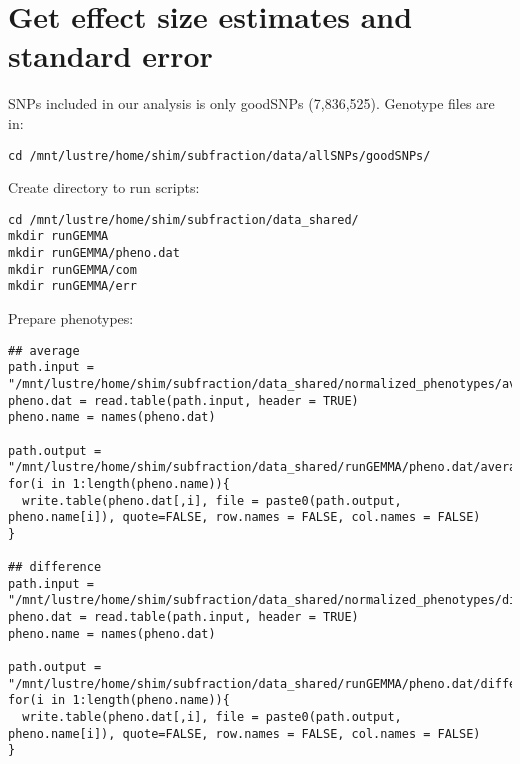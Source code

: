 \documentclass[11pt]{article}
\begin{document}
\section{Get effect size estimates and standard error}
\label{sec-4}
SNPs included in our analysis is only goodSNPs (7,836,525). Genotype files are in:
\begin{lstlisting}
cd /mnt/lustre/home/shim/subfraction/data/allSNPs/goodSNPs/
\end{lstlisting}

Create directory to run scripts:
\begin{lstlisting}
cd /mnt/lustre/home/shim/subfraction/data_shared/
mkdir runGEMMA
mkdir runGEMMA/pheno.dat
mkdir runGEMMA/com
mkdir runGEMMA/err
\end{lstlisting}

Prepare phenotypes:
\begin{lstlisting}
## average
path.input = "/mnt/lustre/home/shim/subfraction/data_shared/normalized_phenotypes/average.txt"
pheno.dat = read.table(path.input, header = TRUE)
pheno.name = names(pheno.dat)

path.output = "/mnt/lustre/home/shim/subfraction/data_shared/runGEMMA/pheno.dat/average."
for(i in 1:length(pheno.name)){
  write.table(pheno.dat[,i], file = paste0(path.output, pheno.name[i]), quote=FALSE, row.names = FALSE, col.names = FALSE)
}

## difference
path.input = "/mnt/lustre/home/shim/subfraction/data_shared/normalized_phenotypes/difference.txt"
pheno.dat = read.table(path.input, header = TRUE)
pheno.name = names(pheno.dat)

path.output = "/mnt/lustre/home/shim/subfraction/data_shared/runGEMMA/pheno.dat/difference."
for(i in 1:length(pheno.name)){
  write.table(pheno.dat[,i], file = paste0(path.output, pheno.name[i]), quote=FALSE, row.names = FALSE, col.names = FALSE)
}
\end{lstlisting}
\end{document}
